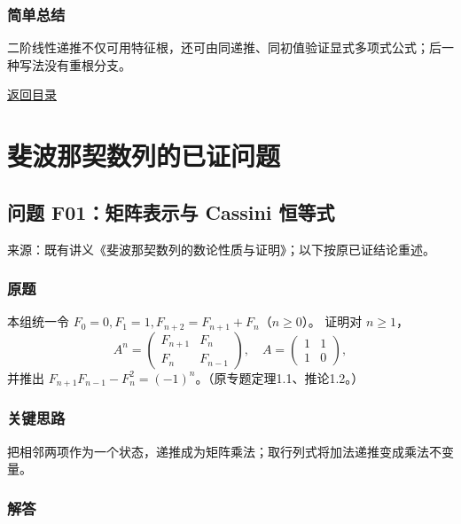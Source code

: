 \documentclass[11pt,a4paper]{article}
\begin{document}
\subsubsection{简单总结}\label{ux7b80ux5355ux603bux7ed3-32}

二阶线性递推不仅可用特征根，还可由同递推、同初值验证显式多项式公式；后一种写法没有重根分支。

\noindent\hyperref[contents]{返回目录}

\clearpage

\section{斐波那契数列的已证问题}\label{ux6590ux6ce2ux90a3ux5951ux6570ux5217ux7684ux5df2ux8bc1ux95eeux9898}

\subsection{问题 F01：矩阵表示与 Cassini
恒等式}\label{ux95eeux9898-f01ux77e9ux9635ux8868ux793aux4e0e-cassini-ux6052ux7b49ux5f0f}

来源：既有讲义《斐波那契数列的数论性质与证明》；以下按原已证结论重述。

\subsubsection{原题}\label{ux539fux9898-33}

本组统一令 \(F_0=0,F_1=1,F_{n+2}=F_{n+1}+F_n\)（\(n\ge0\)）。 证明对
\(n\ge1\)，
\[A^n=\begin{pmatrix}F_{n+1}&F_n\\F_n&F_{n-1}\end{pmatrix},\quad A=\begin{pmatrix}1&1\\1&0\end{pmatrix},\]
并推出 \(F_{n+1}F_{n-1}-F_n^2=(-1)^n\)。（原专题定理1.1、推论1.2。）

\subsubsection{关键思路}\label{ux5173ux952eux601dux8def-33}

把相邻两项作为一个状态，递推成为矩阵乘法；取行列式将加法递推变成乘法不变量。

\subsubsection{解答}\label{ux89e3ux7b54-33}
\end{document}
